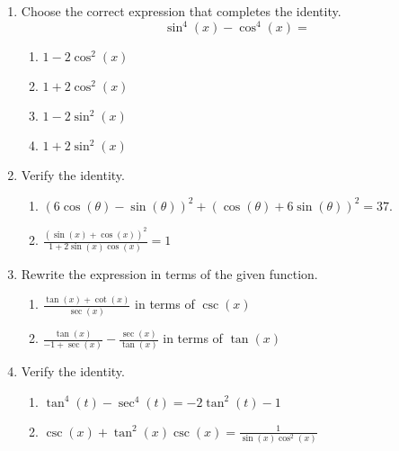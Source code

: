 \begin{enumerate}
\item Choose the correct expression that completes the identity.
$$\sin^4(x)-\cos^4(x)=$$
\begin{enumerate}
\item $1-2\cos^2(x)$
\item $1+2\cos^2(x)$
\item $1-2\sin^2(x)$
\item $1+2\sin^2(x)$
\end{enumerate}
\vfill

\item Verify the identity.

\begin{enumerate}
\item $\left(6\cos(\theta)-\sin(\theta)\right)^2+\left(\cos(\theta)+6\sin(\theta)\right)^2=37$.
\vfill
\item $\displaystyle \frac{(\sin(x)+\cos(x))^2}{1+2\sin(x)\cos(x)}=1$
\vfill
\end{enumerate}

\newpage


\item Rewrite the expression in terms of the given function.
\begin{enumerate}
\item $\displaystyle \frac{\tan(x)+\cot(x)}{\sec(x)}$ in terms of $\csc(x)$
\vfill
\item $\displaystyle \frac{\tan(x)}{-1+\sec(x)}-\frac{\sec(x)}{\tan(x)}$ in terms of $\tan(x)$
\vfill

\end{enumerate}

\newpage
\item Verify the identity.

\begin{enumerate}
\item $\tan^4(t)-\sec^4(t)=-2\tan^2(t)-1$
\vfill
\item $\displaystyle \csc(x)+\tan^2(x)\csc(x)=\frac{1}{\sin(x)\cos^2(x)}$
\vfill
\end{enumerate}






\end{enumerate}
